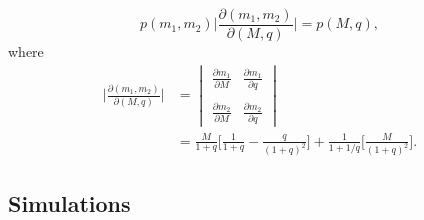 \documentclass[a4paper,12pt]{article}
\begin{document}
\begin{equation}
p(m_1,m_2)\bigg|\frac{\partial(m_1,m_2)}{\partial(M,q)}\bigg|=p(M,q),
\label{eq:m1m2toMtotalq}
\end{equation}
where
\begin{equation}
\begin{split}
\bigg| \frac{\partial(m_1,m_2)}{\partial(M,q)} \bigg| &=
\begin{vmatrix}
     \displaystyle
     \frac{\partial m_1}{\partial M} &
     \displaystyle
     \frac{\partial m_1}{\partial q} \\ \\
     \displaystyle
     \frac{\partial m_2}{\partial M} & 
     \displaystyle
     \frac{\partial m_2}{\partial q}   
\end{vmatrix} \\
&= \frac{M}{1 + q} \bigg[ \frac{1}{1 + q} - \frac{q}{(1 + q)^{2}} \bigg] + \frac{1}{1 + 1/q} \bigg[ \frac{M}{(1 + q)^{2}} \bigg] .
\label{eq:jacobianm1m2toMtotalq}
\end{split}
\end{equation}

\subsection{Simulations}
\label{subsec:simulations}
\end{document}
